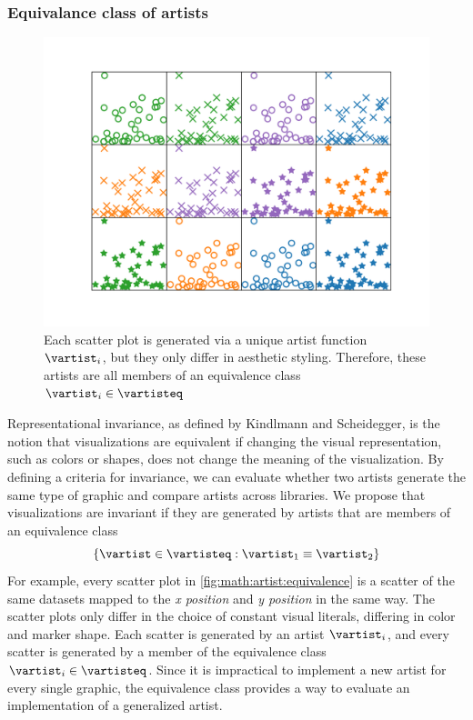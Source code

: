 \documentclass[../main.tex]{subfiles}
\begin{document}
\subsubsection{Equivalance class of artists}
\label{sec:artist_equivalance}
\begin{figure}[H]
    \includegraphics[width=1\textwidth]{figures/math/equivalent_artists.png}
   \caption{Each scatter plot is generated via a unique artist function $\vartist_{i}$, but they only differ in aesthetic styling. Therefore, these artists are all members of an equivalence class $\vartist_{i} \in \vartisteq$}
    \label{fig:math:artist:equivalence}
\end{figure}
Representational invariance, as defined by Kindlmann and Scheidegger, is the notion that visualizations are equivalent if changing the visual representation, such as colors or shapes, does not change the meaning of the visualization\cite{kindlmannAlgebraicProcessVisualization2014}. By defining a criteria for invariance, we can evaluate whether two artists generate the same type of graphic and compare artists across libraries. We propose that visualizations are invariant if they are generated by artists that are members of an equivalence class 
\begin{equation*}
\{\vartist \in \vartisteq: \vartist_{1} \equiv \vartist_{2}\}
\label{eq:math:artist:aprime}
\end{equation*}
For example, every scatter plot in \autoref{fig:math:artist:equivalence} is a scatter of the same datasets mapped to the \textit{x position} and \textit{y position} in the same way. The scatter plots only differ in the choice of constant visual literals, differing in color and marker shape. Each scatter is generated by an artist $\vartist_{i}$, and every scatter is generated by a member of the equivalence class $\vartist_{i} \in \vartisteq$. Since it is impractical to implement a new artist for every single graphic, the equivalence class provides a way to evaluate an implementation of a generalized artist. 
\end{document}
